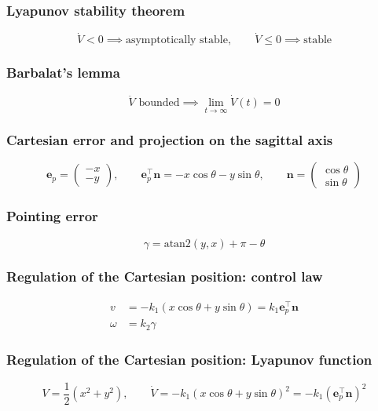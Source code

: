 \subsubsection{Lyapunov stability theorem}
\begin{equation*}
    \dot V<0\implies\text{asymptotically stable},\qquad\dot V\le0\implies\text{stable}
\end{equation*}

\subsubsection{Barbalat's lemma}
\begin{equation*}
    \ddot V\text{ bounded}\implies\lim_{t\to\infty}\dot V(t)=0
\end{equation*}

\subsubsection{Cartesian error and projection on the sagittal axis}
\begin{equation*}
    \mathbf e_p=\begin{pmatrix}-x\\-y\end{pmatrix},\qquad\mathbf e_p^\top\mathbf n=-x\cos\theta-y\sin\theta,\qquad\mathbf n=\begin{pmatrix}\cos\theta\\\sin\theta\end{pmatrix}
\end{equation*}

\subsubsection{Pointing error}
\begin{equation*}
    \gamma=\text{atan2}(y,x)+\pi-\theta
\end{equation*}

\subsubsection{Regulation of the Cartesian position: control law}
\begin{align*}
    v&=-k_1(x\cos\theta+y\sin\theta)=k_1\mathbf e_p^\top\mathbf n\\
    \omega&=k_2\gamma
\end{align*}

\subsubsection{Regulation of the Cartesian position: Lyapunov function}
\begin{equation*}
    V=\frac{1}{2}(x^2+y^2),\qquad\dot V=-k_1(x\cos\theta+y\sin\theta)^2=-k_1(\mathbf e_p^\top\mathbf n)^2
\end{equation*}

